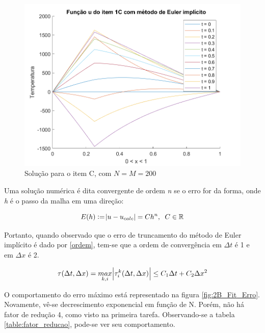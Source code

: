 \documentclass[12pt]{article}
\begin{document}
\begin{spacing}{1.5}
\begin{figure}[ht!]
    \centering
    \includegraphics[width=0.45\linewidth]{Segunda_Tarefa/ItemB/itemC_2D.png}
    \caption{Solução para o item C, com $N=M=200$}
    \label{fig:Tarefa2B_itemC_2D}
\end{figure}

Uma solução numérica é dita convergente de ordem \textit{n} se o erro for da forma\supercite{leVeque}, onde \textit{h} é o passo da malha em uma direção:

\begin{equation}\label{erro_proporcional}
    E(h):=\abs{u-u_{calc}}=C h^n, \;\;C \in \mathbb{R}
\end{equation}

\clearpage
Portanto, quando observado que o erro de truncamento do método de Euler implícito é dado por \eqref{ordem}, tem-se que a ordem de convergência em $\Delta t$ é 1 e em $\Delta x$ é 2.

\begin{equation}\label{ordem}
    \tau(\Delta t, \Delta x)= \underset{k,i}{max}\abs{\tau^k_i(\Delta t,\Delta x)} \leq C_1\Delta t + C_2 \Delta x^2
\end{equation}

O comportamento do erro máximo está representado na figura \ref{fig:2B_Fit_Erro}. Novamente, vê-se decrescimento exponencial em função de N. Porém, não há fator de redução 4, como visto na primeira tarefa. Observando-se a tabela \ref{table:fator_reducao}, pode-se ver seu comportamento.


\end{spacing}
\end{document}
